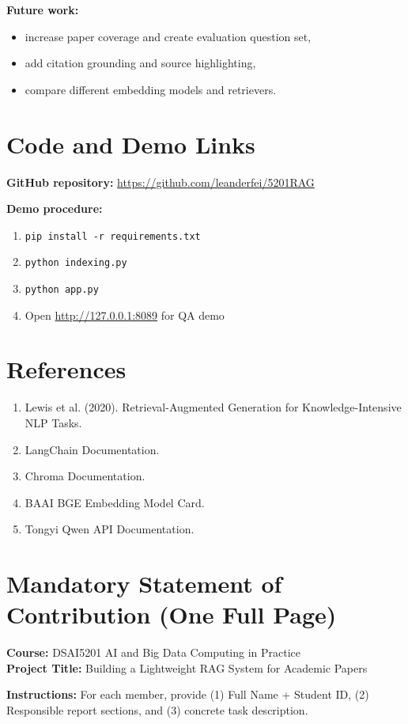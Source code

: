 \documentclass[11pt,a4paper]{article}
\begin{document}
\textbf{Future work:}
\begin{itemize}[leftmargin=1.4em]
  \item increase paper coverage and create evaluation question set,
  \item add citation grounding and source highlighting,
  \item compare different embedding models and retrievers.
\end{itemize}

\section{Code and Demo Links}
\textbf{GitHub repository:} \url{https://github.com/leanderfei/5201RAG}

\textbf{Demo procedure:}
\begin{enumerate}[leftmargin=1.4em]
  \item \texttt{pip install -r requirements.txt}
  \item \texttt{python indexing.py}
  \item \texttt{python app.py}
  \item Open \url{http://127.0.0.1:8089} for QA demo
\end{enumerate}

\section*{References}
\begin{enumerate}[leftmargin=1.4em]
  \item Lewis et al. (2020). Retrieval-Augmented Generation for Knowledge-Intensive NLP Tasks.
  \item LangChain Documentation.
  \item Chroma Documentation.
  \item BAAI BGE Embedding Model Card.
  \item Tongyi Qwen API Documentation.
\end{enumerate}

\newpage
\section*{Mandatory Statement of Contribution (One Full Page)}
\textbf{Course:} DSAI5201 AI and Big Data Computing in Practice \\
\textbf{Project Title:} Building a Lightweight RAG System for Academic Papers

\vspace{0.8em}
\textbf{Instructions:}
For each member, provide (1) Full Name + Student ID, (2) Responsible report sections,
and (3) concrete task description.
\end{document}
